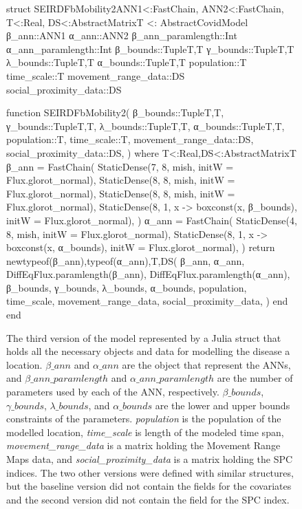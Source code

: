\begin{figure}[!htb]
\centering
\begin{jllisting}
struct SEIRDFbMobility2{ANN1<:FastChain,
                        ANN2<:FastChain,
                        T<:Real,
                        DS<:AbstractMatrix{T}} <: AbstractCovidModel
    β_ann::ANN1
    α_ann::ANN2
    β_ann_paramlength::Int
    α_ann_paramlength::Int
    β_bounds::Tuple{T,T}
    γ_bounds::Tuple{T,T}
    λ_bounds::Tuple{T,T}
    α_bounds::Tuple{T,T}
    population::T
    time_scale::T
    movement_range_data::DS
    social_proximity_data::DS

    function SEIRDFbMobility2(
        β_bounds::Tuple{T,T},
        γ_bounds::Tuple{T,T},
        λ_bounds::Tuple{T,T},
        α_bounds::Tuple{T,T},
        population::T,
        time_scale::T,
        movement_range_data::DS,
        social_proximity_data::DS,
    ) where {T<:Real,DS<:AbstractMatrix{T}}
        β_ann = FastChain(
            StaticDense(7, 8, mish, initW = Flux.glorot_normal),
            StaticDense(8, 8, mish, initW = Flux.glorot_normal),
            StaticDense(8, 8, mish, initW = Flux.glorot_normal),
            StaticDense(8, 1,
                        x -> boxconst(x, β_bounds),
                        initW = Flux.glorot_normal),
        )
        α_ann = FastChain(
            StaticDense(4, 8, mish, initW = Flux.glorot_normal),
            StaticDense(8, 1,
                        x -> boxconst(x, α_bounds),
                        initW = Flux.glorot_normal),
        )
        return new{typeof(β_ann),typeof(α_ann),T,DS}(
            β_ann, α_ann,
            DiffEqFlux.paramlength(β_ann),
            DiffEqFlux.paramlength(α_ann),
            β_bounds, γ_bounds, λ_bounds, α_bounds, population,
            time_scale,
            movement_range_data,
            social_proximity_data,
        )
    end
end
\end{jllisting}
\caption{The third version of the model represented by a Julia struct that holds all the necessary objects and data for modelling the disease a location. \textit{$\beta\_ann$} and \textit{$\alpha\_ann$} are the object that represent the \glspl{ANN}, and \textit{$\beta\_ann\_paramlength$} and \textit{$\alpha\_ann\_paramlength$} are the number of parameters used by each of the \gls{ANN}, respectively. \textit{$\beta\_bounds$}, \textit{$\gamma\_bounds$}, \textit{$\lambda\_bounds$}, and \textit{$\alpha\_bounds$} are the lower and upper bounds constraints of the parameters. \textit{population} is the population of the modelled location, \textit{time\_scale} is length of the modeled time span, \textit{movement\_range\_data} is a matrix holding the Movement Range Maps data, and \textit{social\_proximity\_data} is a matrix holding the \gls{SPC} indices. The two other versions were defined with similar structures, but the baseline version did not contain the fields for the covariates and the second version did not contain the field for the \gls{SPC} index.}
\label{fig:diffeq-seird-fb2-struct}
\end{figure}

